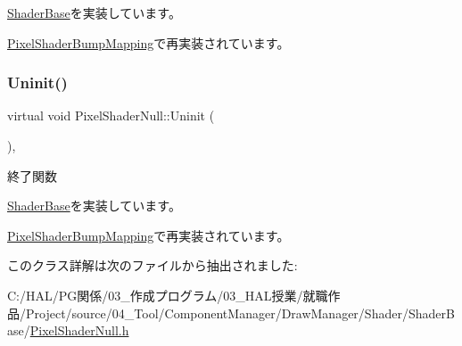 \mbox{\hyperlink{class_shader_base_ac78c78ede3b8e48cf28b739b97456620}{Shader\+Base}}を実装しています。



\mbox{\hyperlink{class_pixel_shader_bump_mapping_afa80c2404b490a444d54cc47c681ca8f}{Pixel\+Shader\+Bump\+Mapping}}で再実装されています。

\mbox{\label{class_pixel_shader_null_ae5ee2fa95e5da787918ccbd1877cd0ef}} 
\subsubsection{\texorpdfstring{Uninit()}{Uninit()}}
{\footnotesize\ttfamily virtual void Pixel\+Shader\+Null\+::\+Uninit (\begin{DoxyParamCaption}{ }\end{DoxyParamCaption})\hspace{0.3cm}{\ttfamily [inline]}, {\ttfamily [virtual]}}



終了関数 



\mbox{\hyperlink{class_shader_base_a784edfa81bec4d08a257ed4f02c61222}{Shader\+Base}}を実装しています。



\mbox{\hyperlink{class_pixel_shader_bump_mapping_a004f731db6dab6b59949baed4a5a32d7}{Pixel\+Shader\+Bump\+Mapping}}で再実装されています。



このクラス詳解は次のファイルから抽出されました\+:\begin{DoxyCompactItemize}
\item 
C\+:/\+H\+A\+L/\+P\+G関係/03\+\_\+作成プログラム/03\+\_\+\+H\+A\+L授業/就職作品/\+Project/source/04\+\_\+\+Tool/\+Component\+Manager/\+Draw\+Manager/\+Shader/\+Shader\+Base/\mbox{\hyperlink{_pixel_shader_null_8h}{Pixel\+Shader\+Null.\+h}}\end{DoxyCompactItemize}
